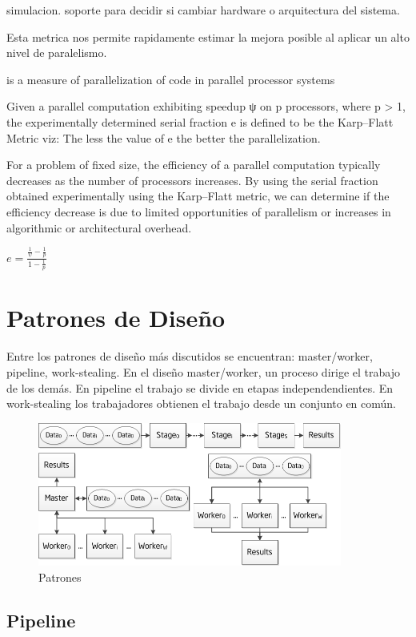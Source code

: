 \documentclass[a4paper]{report}
\begin{document}
simulacion. soporte para decidir si cambiar hardware o arquitectura del
sistema.

Esta metrica nos permite rapidamente estimar la mejora posible al aplicar un alto nivel de paralelismo.

 is a measure of parallelization of code in parallel processor systems

Given a parallel computation exhibiting speedup ψ on p processors, where p > 1, the experimentally determined serial fraction e is defined to be the Karp–Flatt Metric viz: The less the value of e the better the parallelization.

For a problem of fixed size, the efficiency of a parallel computation typically decreases as the number of processors increases. By using the serial fraction obtained experimentally using the Karp–Flatt metric, we can determine if the efficiency decrease is due to limited opportunities of parallelism or increases in algorithmic or architectural overhead.

$ e = \frac{\frac{1}{\psi} - \frac{1}{p}}{1 - \frac{1}{p}} $

\section{Patrones de Dise\~no}

Entre los patrones de dise\~no m\'as discutidos se encuentran: master/worker,
pipeline, work-stealing. En el dise\~no master/worker, un proceso dirige el
trabajo de los dem\'as. En pipeline el trabajo se divide en etapas
independendientes. En work-stealing los trabajadores obtienen el trabajo desde
un conjunto en com\'un.

\begin{figure}[H]
\begin{center}
\includegraphics[width=10cm]{patterns.png}
\caption{Patrones}
\end{center}
\end{figure}

\subsection{Pipeline}
\end{document}
